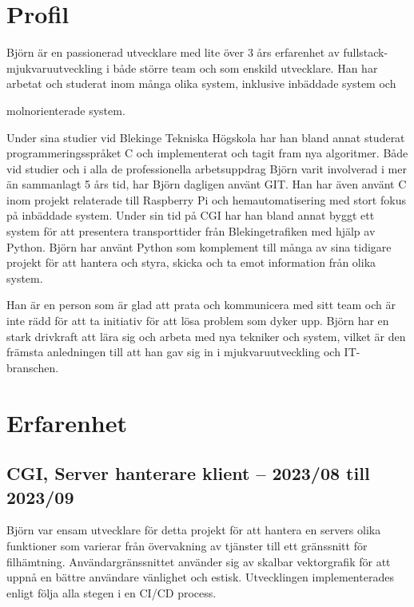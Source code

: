 \documentclass{article}
\begin{document}
\noindent
\begin{minipage}[t]{0.7\textwidth}
\vspace{-20pt} %
\section*{\textcolor{colorBlue}{Profil}}
Björn är en passionerad utvecklare med lite över 3 års erfarenhet av fullstack-mjukvaruutveckling 
i både större team och som enskild utvecklare. Han har arbetat och studerat inom många olika system, 
inklusive inbäddade system och 

molnorienterade system.

\vspace{10pt}
Under sina studier vid Blekinge Tekniska Högskola har han bland annat studerat programmeringsspråket C 
och implementerat och tagit fram nya algoritmer. Både vid studier och i alla de professionella arbetsuppdrag 
Björn varit involverad i mer än sammanlagt 5 års tid, har Björn dagligen använt GIT. Han har även använt C 
inom projekt relaterade till Raspberry Pi och hemautomatisering med stort fokus på inbäddade system. 
Under sin tid på CGI har han bland annat byggt ett system för att presentera transporttider från 
Blekingetrafiken med hjälp av Python. Björn har använt Python som komplement till många av sina 
tidigare projekt för att hantera och styra, skicka och ta emot information från olika system.

\vspace{10pt}
Han är en person som är glad att prata och kommunicera med sitt team och är inte rädd för att ta 
initiativ för att lösa problem som dyker upp. Björn har en stark drivkraft att lära sig och arbeta 
med nya tekniker och system, vilket är den främsta anledningen till att han gav sig in i 
mjukvaruutveckling och IT-branschen.


\vspace{15pt} %
\section*{\textcolor{colorBlue}{Erfarenhet}}

\subsection*{\textcolor{colorTitelErfarenhet}{CGI, Server hanterare klient – 2023/08 till 2023/09}}
Björn var ensam utvecklare för detta projekt för att hantera en servers olika funktioner som 
varierar från övervakning av tjänster till ett gränssnitt för filhämtning. Användargränssnittet 
använder sig av skalbar vektorgrafik för att uppnå en bättre användare vänlighet och estisk. 
Utvecklingen implementerades enligt följa alla stegen i en CI/CD process. 


\end{minipage}
\end{document}
